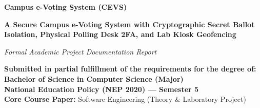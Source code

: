 \documentclass[12pt,a4paper,oneside]{report}
\begin{document}
\begin{titlepage}
    \centering
    \vspace*{0.5cm}
    
    {\Huge \bfseries \color{darkblue} Campus e-Voting System (CEVS)\par}
    \vspace{0.4cm}
    {\Large \bfseries A Secure Campus e-Voting System with Cryptographic Secret Ballot Isolation, Physical Polling Desk 2FA, and Lab Kiosk Geofencing \par}
    \vspace{0.8cm}
    {\large \textsl{Formal Academic Project Documentation Report} \par}
    \vspace{1.5cm}
    
    \begin{figure}[H]
        \centering
    \end{figure}

    \vspace{1.2cm}
    
    \begin{minipage}[t]{0.9\textwidth}
        \centering
        \textbf{Submitted in partial fulfillment of the requirements for the degree of:}\\[0.2cm]
        \textbf{Bachelor of Science in Computer Science (Major)}\\[0.15cm]
        \textbf{National Education Policy (NEP 2020) --- Semester 5}\\[0.15cm]
        \textbf{Core Course Paper:} Software Engineering (Theory \& Laboratory Project)
    \end{minipage}

    \vspace{1.8cm}


\end{titlepage}
\end{document}

